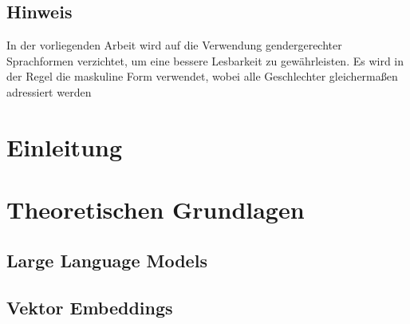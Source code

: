 \documentclass[
	12pt, %
	a4paper,
	bibliography=totoc, %
	numbers=noenddot, %
	ngerman, %
	headsepline, %
	oneside %
	]{scrbook} %
\begin{document}

\newpage

\tableofcontents{}

\listoffigures
{}

\listoftables
{}

\section*{Hinweis}

In der vorliegenden Arbeit wird auf die Verwendung gendergerechter Sprachformen verzichtet, um eine bessere Lesbarkeit zu gewährleisten.
Es wird in der Regel die maskuline Form verwendet, wobei alle Geschlechter gleichermaßen adressiert werden
\clearpage




\printnoidxglossaries{}

\clearpage



\chapter{Einleitung}\label{ch:einleitung}
\label{chap:einleitung}


\chapter{Theoretischen Grundlagen}
\label{chap:grundlagen}


\section{Large Language Models}


\section{Vektor Embeddings}

\end{document}
